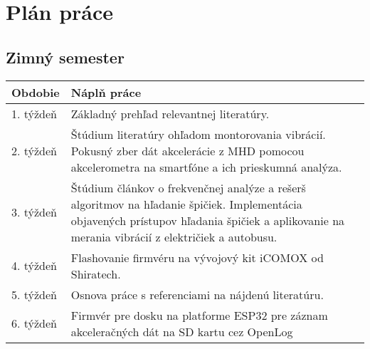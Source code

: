\thispagestyle{empty}
\chapter{Plán práce}
\renewcommand*{\thepage}{A-\arabic{page}}

\section{Zimný semester}

\begin{table}[h!]
\def\arraystretch{1.25}
\begin{tabular}{|l|p{12cm}|}
\hline
\textbf{Obdobie} & \textbf{Náplň práce}                                                                                                                                                                                                                         \\ \hline
1. týždeň         & Základný prehľad relevantnej literatúry.                                                                                                                                                                                                      \\ \hline
2. týždeň         & Štúdium literatúry ohľadom montorovania vibrácií. Pokusný zber dát akcelerácie z MHD pomocou akcelerometra na smartfóne a ich prieskumná analýza.                                             \\ \hline
3. týždeň         & Štúdium článkov o frekvenčnej analýze a rešerš algoritmov na hľadanie špičiek. Implementácia objavených prístupov hľadania špičiek a aplikovanie na merania vibrácií z električiek a autobusu. \\ \hline
4. týždeň         & Flashovanie firmvéru na vývojový kit iCOMOX od Shiratech.                                                                                                                                                                                                  \\ \hline
5. týždeň         & Osnova práce s referenciami na nájdenú literatúru.                                                                                                                                                                                            \\ \hline
6. týždeň         & Firmvér pre dosku na platforme ESP32 pre záznam akceleračných dát na SD kartu cez OpenLog \\ \hline

\end{tabular}
\end{table}
